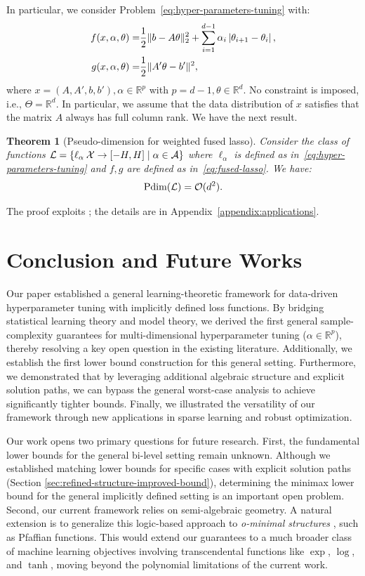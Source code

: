 \documentclass{article}
\theoremstyle{plain}
\newtheorem{theorem}{Theorem}[section]
\theoremstyle{definition}
\theoremstyle{remark}
\newcommand*{\RR}{\mathbb{R}}
\begin{document}
In particular, we consider Problem~\eqref{eq:hyper-parameters-tuning} with:
\begin{equation}
    \label{eq:fused-lasso}
    \begin{aligned}
        f(x, \alpha, \theta) = & \frac{1}{2} \|b - A\theta\|_2^2 + \sum_{i = 1}^{d - 1}\alpha_i\left| \theta_{i + 1} - \theta_i \right|,\\
		g(x, \alpha, \theta) = & \frac{1}{2}\|A'\theta - b'\|^2,
    \end{aligned}
\end{equation}
where $x = (A, A', b, b'), \alpha \in \RR^{p}$ with $p = d-1, \theta \in \RR^d$. No constraint is imposed, i.e., $\Theta = \RR^d$. In particular, we assume that the data distribution of $x$ satisfies that the matrix $A$ always has full column rank. We have the next result.

\begin{theorem}[Pseudo-dimension for weighted fused lasso]
    \label{thm:fused-lasso}
    Consider the class of functions $\mathcal{L} =\{\ell_\alpha\:\mathcal{X} \to [-H,H] \mid \alpha \in \mathcal{A}\}$ where $\ell_\alpha$ is defined as in~\eqref{eq:hyper-parameters-tuning} and $f,g$ are defined as in~\eqref{eq:fused-lasso}. We have: 
    $$\text{\normalfont Pdim}(\mathcal{L}) = \mathcal{O}(d^2).$$
\end{theorem}
The proof exploits ; the details are in Appendix~\ref{appendix:applications}.

\section{Conclusion and Future Works}
Our paper established a general learning-theoretic framework for data-driven hyperparameter tuning with implicitly defined loss functions. By bridging statistical learning theory and model theory, we derived the first general sample-complexity guarantees for multi-dimensional hyperparameter tuning ($\alpha \in \mathbb{R}^p$), thereby resolving a key open question in the existing literature. Additionally, we establish the first lower bound construction for this general setting. Furthermore, we demonstrated that by leveraging additional algebraic structure and explicit solution paths, we can bypass the general worst-case analysis to achieve significantly tighter bounds. Finally, we illustrated the versatility of our framework through new applications in sparse learning and robust optimization.

Our work opens two primary questions for future research. First, the fundamental lower bounds for the general bi-level setting remain unknown. Although we established matching lower bounds for specific cases with explicit solution paths (Section \ref{sec:refined-structure-improved-bound}), determining the minimax lower bound for the general implicitly defined setting is an important open problem. Second, our current framework relies on semi-algebraic geometry. A natural extension is to generalize this logic-based approach to \textit{o-minimal structures} \citep{van1998tame}, such as Pfaffian functions. This would extend our guarantees to a much broader class of machine learning objectives involving transcendental functions like $\exp$, $\log$, and $\tanh$, moving beyond the polynomial limitations of the current work.
\end{document}
